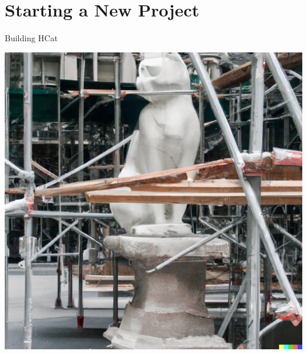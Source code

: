 \documentclass[10pt, presentation, colorlinks]{beamer}
\begin{document}
\section{Starting a New Project}
\label{sec:org82ee183}

\begin{frame}[label={sec:org55d7bde}]{Building HCat}
\begin{center}
\includegraphics[width=.9\linewidth]{./img/building-hcat.png}
\end{center}
\end{frame}
\end{document}
